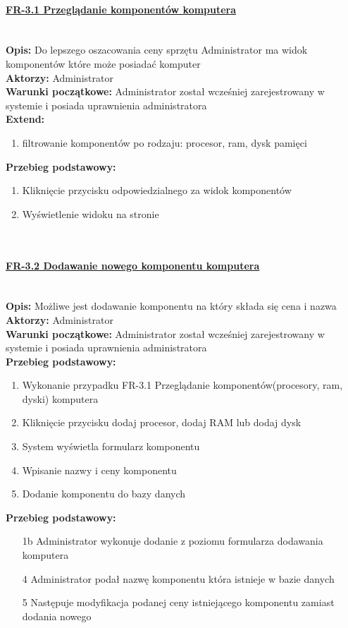 \paragraph{\underline{FR-3.1 Przeglądanie komponentów komputera}}\mbox{}\\[1mm]
	\noindent\textbf{Opis:} Do lepszego oszacowania ceny sprzętu Administrator ma widok komponentów które może posiadać komputer\\
	\noindent\textbf{Aktorzy:} Administrator\\
	\textbf{Warunki początkowe:} Administrator został wcześniej zarejestrowany w systemie i posiada uprawnienia administratora\\
	\textbf{Extend:}
    \begin{enumerate}[noparskip]
		\item filtrowanie komponentów po rodzaju: procesor, ram, dysk pamięci
	\end{enumerate}
  \textbf{Przebieg podstawowy:}
	\begin{enumerate}[noparskip]
		\item Kliknięcie przycisku odpowiedzialnego za widok komponentów
		\item Wyświetlenie widoku na stronie
  \end{enumerate} \mbox{}\\[-11mm]

\paragraph{\underline{FR-3.2 Dodawanie nowego komponentu komputera}}\mbox{}\\[1mm]
	\noindent\textbf{Opis:} Możliwe jest dodawanie komponentu na który składa się cena i nazwa\\
	\noindent\textbf{Aktorzy:} Administrator\\
	\textbf{Warunki początkowe:} Administrator został wcześniej zarejestrowany w systemie i posiada uprawnienia administratora\\
  \textbf{Przebieg podstawowy:}
  \begin{enumerate}[noparskip]
		\item Wykonanie przypadku FR-3.1 Przeglądanie komponentów(procesory, ram, dyski) komputera
		\item Kliknięcie przycisku dodaj procesor, dodaj RAM lub dodaj dysk
		\item System wyświetla formularz komponentu
		\item Wpisanie nazwy i ceny komponentu
		\item Dodanie komponentu do bazy danych
  \end{enumerate}
  \textbf{Przebieg podstawowy:}
  \begin{enumerate}[noparskip]
		\item[1b] Administrator wykonuje dodanie z poziomu formularza dodawania komputera
		\item[4] Administrator podał nazwę komponentu która istnieje w bazie danych
		\item[5] Następuje modyfikacja podanej ceny istniejącego komponentu zamiast dodania nowego
  \end{enumerate} \mbox{}\\[-11mm]

